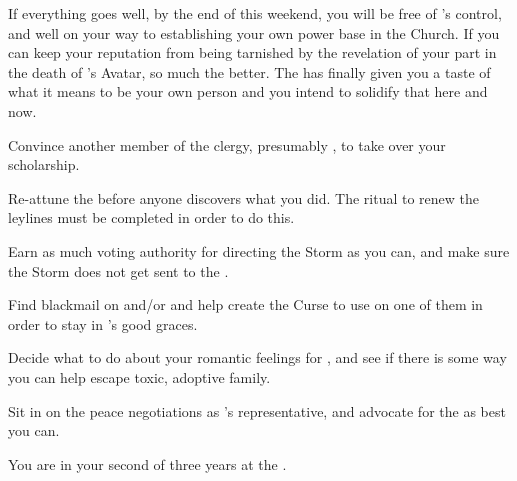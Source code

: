 \documentclass[char]{GL2020}
\begin{document}
If everything goes well, by the end of this weekend, you will be free of \cAntiChup{}'s control, and well on your way to establishing your own power base in the Church. If you can keep your reputation from being tarnished by the revelation of your part in the death of \cEbb{}'s Avatar, so much the better. The \pSchool{} has finally given you a taste of what it means to be your own person and you intend to solidify that here and now.

\begin{itemz}
	\item Convince another member of the \pTech{} clergy, presumably \cBeetle{}, to take over your scholarship.
	\item Re-attune the \iScythe{} before anyone discovers what you did. The ritual to renew the leylines must be completed in order to do this.
	\item Earn as much voting authority for directing the Storm as you can, and make sure the Storm does not get sent to the \pTech{}.
	\item Find blackmail on \cInitiate{} and/or \cPirate{} and help create the Curse to use on one of them in order to stay in \cAntiChup{}'s good graces.
	\item Decide what to do about your romantic feelings for \cAdopted{}, and see if there is some way you can help \cAdopted{\them} escape \cAdopted{\their} toxic, adoptive family.
	\item Sit in on the peace negotiations as \cAntiChup{}'s representative, and advocate for the \pTech{} as best you can.
\end{itemz}

\begin{itemz}[Notes]
	\item You are in your second of three years at the \pSchool{}.
\end{itemz}
\end{document}
